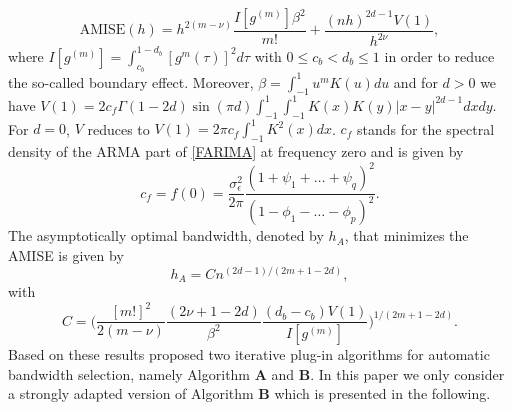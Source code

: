 \documentclass[12pt]{article}
\newtheorem{theorem}{Theorem}
\begin{document}
\begin{equation}
	\label{AMISE}
	\text{AMISE}(h) = h^{2(m-\nu)} \frac{I[g^{(m)}]\beta^2}{m!} + \frac{(nh)^{2d-1}V(1)}{h^{2\nu}},
\end{equation}
where $I[g^{(m)}] = \int_{c_b}^{1-d_b}[g^{m}(\tau)]^2d\tau$ with $0 \leq c_b < d_b \leq 1$ in order to reduce the so-called boundary effect. Moreover, $\beta = \int_{-1}^{1}u^mK(u)du$ and for $d > 0 $ we have $V(1)=2c_f \Gamma(1-2d)\sin (\pi d) \int_{-1}^{1} \int_{-1}^{1} K(x)K(y)|x-y|^{2d-1}dxdy$. For $d = 0$, $V$ reduces to $V(1)=2\pi c_f \int_{-1}^{1}K^2(x)dx$. $c_f$ stands for the spectral density of the ARMA part of \eqref{FARIMA} at frequency zero and is given by 
\begin{equation}
	c_f = f(0) = \frac{\sigma^2_\epsilon}{2\pi} \frac{(1 + \psi_1+\dots+\psi_q)^2}{(1-\phi_1-\dots-\phi_p)^2}.
\end{equation}
 The asymptotically optimal bandwidth, denoted by $h_A$, that minimizes the AMISE is given by
\begin{equation}
	\label{ha1}
h_A=Cn^{(2d-1)/(2m+1-2d)},
\end{equation}
with 
\begin{equation}
\label{ha2}
C=\Bigg(\frac{[m!]^2}{2(m-\nu)} \frac{(2\nu+1-2d)}{\beta^2}\frac{(d_b - c_b)V(1)}{I[g^{(m)}]}\Bigg)^{1/(2m+1-2d)}.
\end{equation}
Based on these results \citet{beran2002iterative} proposed two iterative plug-in algorithms for automatic bandwidth selection, namely Algorithm \textbf{A} and \textbf{B}. In this paper we only consider a strongly adapted version of Algorithm \textbf{B} which is presented in the following.


 
%
\end{document}
